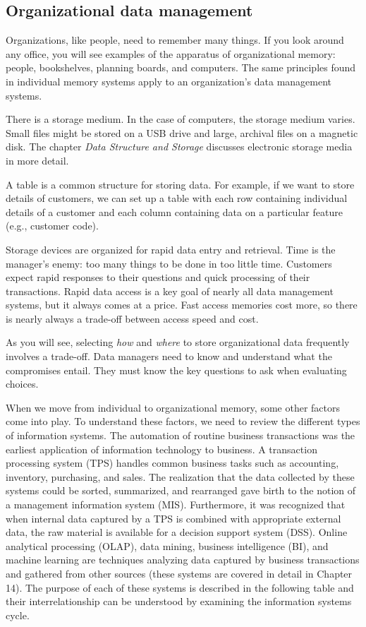 \documentclass[
]{article}
\begin{document}
\hypertarget{organizational-data-management}{%
\subsection*{Organizational data management}\label{organizational-data-management}}

Organizations, like people, need to remember many things. If you look
around any office, you will see examples of the apparatus of
organizational memory: people, bookshelves, planning boards, and
computers. The same principles found in individual memory systems apply
to an organization's data management systems.

There is a storage medium. In the case of computers, the storage medium
varies. Small files might be stored on a USB drive and large, archival
files on a magnetic disk. The chapter \emph{Data Structure and Storage}
discusses electronic storage media in more detail.

A table is a common structure for storing data. For example, if we want
to store details of customers, we can set up a table with each row
containing individual details of a customer and each column containing
data on a particular feature (e.g., customer code).

Storage devices are organized for rapid data entry and retrieval. Time
is the manager's enemy: too many things to be done in too little time.
Customers expect rapid responses to their questions and quick processing
of their transactions. Rapid data access is a key goal of nearly all
data management systems, but it always comes at a price. Fast access
memories cost more, so there is nearly always a trade-off between access
speed and cost.

As you will see, selecting \emph{how} and \emph{where} to store organizational
data frequently involves a trade-off. Data managers need to know and
understand what the compromises entail. They must know the key questions
to ask when evaluating choices.

When we move from individual to organizational memory, some other
factors come into play. To understand these factors, we need to review
the different types of information systems. The automation of routine
business transactions was the earliest application of information
technology to business. A transaction processing system (TPS) handles
common business tasks such as accounting, inventory, purchasing, and
sales. The realization that the data collected by these systems could be
sorted, summarized, and rearranged gave birth to the notion of a
management information system (MIS). Furthermore, it was recognized that
when internal data captured by a TPS is combined with appropriate
external data, the raw material is available for a decision support
system (DSS). Online analytical processing (OLAP), data mining, business
intelligence (BI), and machine learning are techniques analyzing data
captured by business transactions and gathered from other sources (these
systems are covered in detail in Chapter 14). The purpose of each of
these systems is described in the following table and their
interrelationship can be understood by examining the information systems
cycle.
\end{document}
